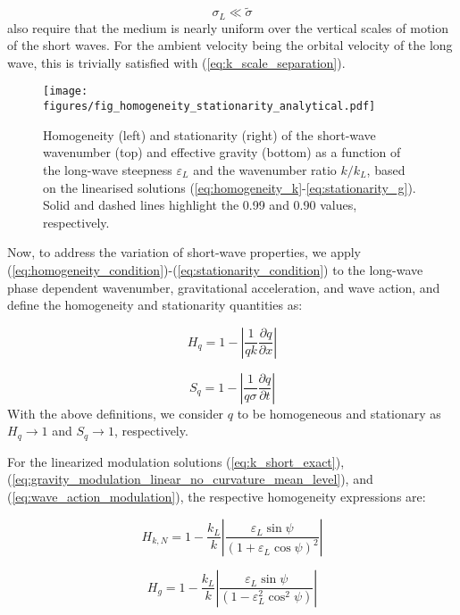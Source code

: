 \documentclass[lineno]{jfm}
\begin{document}
\begin{equation}
  \sigma_L \ll \widetilde{\sigma}
\end{equation}
\citet{bretherton1968wavetrains} also require that the medium is nearly uniform
over the vertical scales of motion of the short waves.
For the ambient velocity being the orbital velocity of the long wave, this is
trivially satisfied with (\ref{eq:k_scale_separation}).

\begin{figure}
\centering
\texttt{[image: figures/fig\_homogeneity\_stationarity\_analytical.pdf]}
\caption{
Homogeneity (left) and stationarity (right) of the short-wave wavenumber (top)
and effective gravity (bottom) as a function of the long-wave steepness
$\varepsilon_L$ and the wavenumber ratio $k/k_L$, based on the linearised
solutions (\ref{eq:homogeneity_k}-\ref{eq:stationarity_g}).
Solid and dashed lines highlight the 0.99 and 0.90 values, respectively.
}
\label{fig:homogeneity_stationarity_analytical}
\end{figure}

Now, to address the variation of short-wave properties,
we apply (\ref{eq:homogeneity_condition})-(\ref{eq:stationarity_condition}) to
the long-wave phase dependent wavenumber, gravitational acceleration, and
wave action, and define the homogeneity and stationarity quantities as:

\begin{equation}
  H_q = 1 - \left| \frac{1}{qk} \frac{\partial q}{\partial x} \right|
\end{equation}

\begin{equation}
  S_q = 1 - \left| \frac{1}{q\sigma} \frac{\partial q}{\partial t} \right|
\end{equation}
With the above definitions, we consider $q$ to be homogeneous and stationary as
$H_q \rightarrow 1$ and $S_q \rightarrow 1$, respectively.

For the linearized modulation solutions (\ref{eq:k_short_exact}),
(\ref{eq:gravity_modulation_linear_no_curvature_mean_level}), and
(\ref{eq:wave_action_modulation}), the respective homogeneity expressions are:

\begin{equation}
  H_{k,N} = 1 - \frac{k_L}{k} \left| \frac{\varepsilon_L \sin{\psi}}{\left(1 + \varepsilon_L \cos{\psi}\right)^2} \right|
  \label{eq:homogeneity_k}
\end{equation}

\begin{equation}
  H_{g} = 1 - \frac{k_L}{k} \left| \frac{\varepsilon_L \sin{\psi}}{\left(1 - \varepsilon_L^2 \cos^2{\psi}\right)} \right|
  \label{eq:homogeneity_g}
\end{equation}
\end{document}
